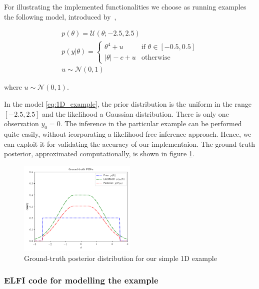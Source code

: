 For illustrating the implemented functionalities we choose as running
examples the following model, introduced by~\autocite{Ikonomov2019},

\begin{gather} \label{eq:1D_example}
  p(\theta) = \mathcal{U}(\theta;-2.5,2.5)\\
  p(y|\theta) = 
  \left\{
    \begin{array}{ll}
      \theta^4 + u & \mbox{if } \theta \in [-0.5, 0.5] \\
      |\theta| - c + u & \mbox{otherwise} 
    \end{array} \right.\\
  u \sim \mathcal{N}(0,1)
\end{gather}

\noindent
where $u \sim \mathcal{N}(0,1)$.

In the model \eqref{eq:1D_example}, the prior distribution is the
uniform in the range $[-2.5, 2.5]$ and the likelihood a Gaussian
distribution. There is only one observation $y_0 = 0$. The inference
in the particular example can be performed quite easily, without
icorporating a likelihood-free inference approach. Hence, we can
exploit it for validating the accuracy of our implementaion. The
ground-truth posterior, approximated computationally, is shown in
figure \ref{fig:example_gt}.

\begin{figure}[h]
    \begin{center}
      \includegraphics[width=0.5\textwidth]{./Thesis/images/chapter3/example_gt.png}
    \end{center}
  \caption{Ground-truth posterior distribution for our simple 1D example}
  \label{fig:example_gt}
\end{figure}

\subsubsection*{ELFI code for modelling the example}

